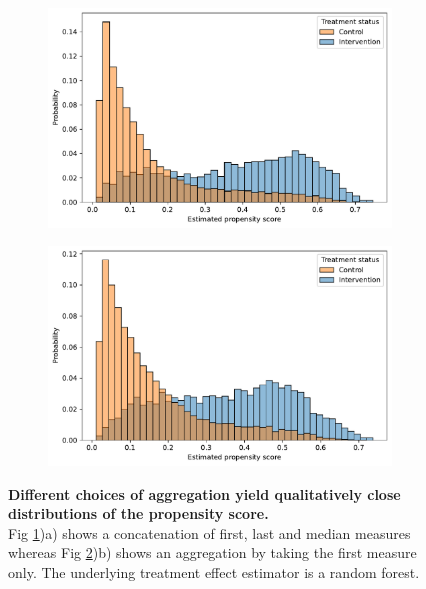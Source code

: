 \documentclass[10pt,letterpaper]{article}
\begin{document}
\begin{figure}[h!]
    \centering
    \begin{subfigure}[b]{0.45\linewidth}
        \centering
        \includegraphics[width=\linewidth]{img_supp_final/sensitivity__ps_distribution__first_last_median__Forests.pdf}
        \caption{}\label{apd:fig:albumin_for_sepsis:overlap_measure_first_last_median}
    \end{subfigure}
    \hfill
    \begin{subfigure}[b]{0.45\linewidth}
        \centering
        \includegraphics[width=\linewidth]{img_supp_final/sensitivity__ps_distribution__first__Forests.pdf}
        \caption{}\label{apd:fig:albumin_for_sepsis:overlap_measure_first}
    \end{subfigure}
    \caption{{\bf Different choices of aggregation yield qualitatively close
                distributions of the propensity score.}\\Fig
        \ref{apd:fig:albumin_for_sepsis:overlap_measure_first_last_median})a)
        shows a concatenation of first, last and median measures whereas Fig
        \ref{apd:fig:albumin_for_sepsis:overlap_measure_first})b) shows an
        aggregation by taking the first measure only. The underlying treatment
        effect estimator is a random forest. }\label{apd:fig:albumin_for_sepsis:overlap_measure}
\end{figure}
\end{document}
